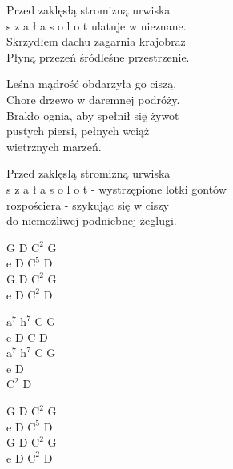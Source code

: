 \begin{text}
Przed zaklęsłą stromizną urwiska\\
s z a ł a s o l o t ulatuje w nieznane.\\
Skrzydłem dachu zagarnia krajobraz\\
Płyną przezeń śródleśne przestrzenie.

\vin Leśna mądrość obdarzyła go ciszą.\\
\vin Chore drzewo w daremnej podróży.\\
\vin Brakło ognia, aby spełnił się żywot\\
\vin pustych piersi, pełnych wciąż\\
\vin wietrznych marzeń.

Przed zaklęsłą stromizną urwiska\\
s z a ł a s o l o t - wystrzępione lotki gontów\\
rozpościera - szykując się w ciszy\\
do niemożliwej podniebnej żeglugi.
\end{text}
\begin{chord}
    G D $\mathrm{C^2}$ G\\
    e D $\mathrm{C^5}$ D\\
    G D $\mathrm{C^2}$ G\\
    e D $\mathrm{C^2}$ D

    $\mathrm{a^7}$ $\mathrm{h^7}$ C G\\
    e D C D\\
    $\mathrm{a^7}$ $\mathrm{h^7}$ C G\\
    e D\\
    $\mathrm{C^2}$ D

    G D $\mathrm{C^2}$ G\\
    e D $\mathrm{C^5}$ D\\
    G D $\mathrm{C^2}$ G\\
    e D $\mathrm{C^2}$ D
\end{chord}
